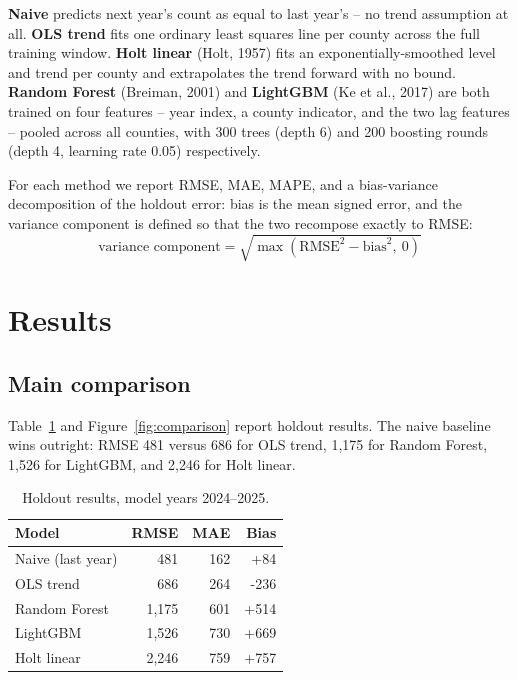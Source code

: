 \documentclass{article}
\begin{document}
\textbf{Naive} predicts next year's count as equal to last year's -- no trend
assumption at all. \textbf{OLS trend} fits one ordinary least squares line per county
across the full training window. \textbf{Holt linear} (Holt, 1957) fits an
exponentially-smoothed level and trend per county and extrapolates the trend forward
with no bound. \textbf{Random Forest} (Breiman, 2001) and \textbf{LightGBM} (Ke et al.,
2017) are both trained on four features -- year index, a county indicator, and the
two lag features -- pooled across all counties, with 300 trees (depth 6) and 200
boosting rounds (depth 4, learning rate 0.05) respectively.

For each method we report RMSE, MAE, MAPE, and a bias-variance decomposition of the
holdout error: bias is the mean signed error, and the variance component is defined so
that the two recompose exactly to RMSE:
\begin{equation}
\text{variance component} = \sqrt{\max(\text{RMSE}^2 - \text{bias}^2,\ 0)}
\end{equation}

\section{Results}

\subsection{Main comparison}
Table~\ref{tab:main} and Figure~\ref{fig:comparison} report holdout results. The naive
baseline wins outright: RMSE 481 versus 686 for OLS trend, 1{,}175 for Random Forest,
1{,}526 for LightGBM, and 2{,}246 for Holt linear.

\begin{table}[h]
\centering
\small
\caption{Holdout results, model years 2024--2025.}
\label{tab:main}
\begin{tabular}{lrrr}
\toprule
Model & RMSE & MAE & Bias \\
\midrule
Naive (last year) & 481 & 162 & +84 \\
OLS trend & 686 & 264 & -236 \\
Random Forest & 1{,}175 & 601 & +514 \\
LightGBM & 1{,}526 & 730 & +669 \\
Holt linear & 2{,}246 & 759 & +757 \\
\bottomrule
\end{tabular}
\end{table}
\end{document}
